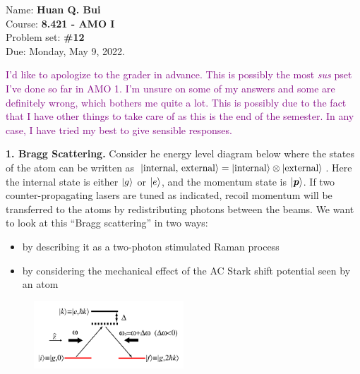 \documentclass{article}
\theoremstyle{definition}
\begin{document}
\begin{framed}
\noindent Name: \textbf{Huan Q. Bui}\\
Course: \textbf{8.421 - AMO I}\\
Problem set: \textbf{\#12}\\
Due: Monday, May 9, 2022.
\end{framed}


\begin{framed}
	\noindent \textcolor{purple}{I'd like to apologize to the grader in advance. This is possibly the most \textit{sus} pset I've done so far in AMO 1. I'm unsure on some of my answers and some are definitely wrong, which bothers me quite a lot. This is possibly due to the fact that I have other things to take care of as this is the end of the semester. In any case, I have tried my best to give sensible responses.}
\end{framed}

\noindent \textbf{1. Bragg Scattering.} Consider he energy level diagram below where the states of the atom can be written as $\ket{\text{internal, external}} = \ket{\text{internal}}\otimes \ket{\text{external}}$. Here the internal state is either $\ket{g}$ or $\ket{e}$, and the momentum state is $\ket{\bm{p}}$. If two counter-propagating lasers are tuned as indicated, recoil momentum will be transferred to the atoms by redistributing photons between the beams. We want to look at this ``Bragg scattering'' in two ways:

\begin{itemize}
	\item by describing it as a two-photon stimulated Raman process
	\item by considering the mechanical effect of the AC Stark shift potential seen by an atom
\end{itemize}

\begin{figure}[!htb]
	\centering
	\includegraphics[width=0.5\textwidth]{bragg}
\end{figure}
\end{document}
